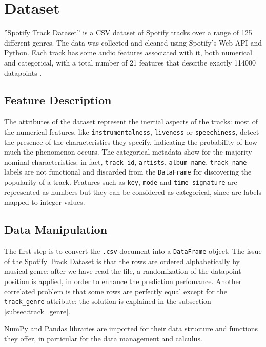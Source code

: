 \documentclass{article}
\begin{document}
\section{Dataset}
''Spotify Track Dataset'' is a CSV dataset of Spotify tracks over a range of 125 different genres. The data was collected and cleaned using Spotify's Web API and Python. Each track has some audio features associated with it, both numerical and categorical, with a total number of 21 features that describe exactly 114000 datapoints \cite{datasetKaggle}. 

\subsection{Feature Description}
\label{subsec:feature_descr}
The attributes of the dataset represent the inertial aspects of the tracks: most of the numerical features, like \texttt{instrumentalness}, \texttt{liveness} or \texttt{speechiness}, detect the presence of the characteristics they specify, indicating the probability of how much the phenomenon occurs. 
The categorical metadata show for the majority nominal characteristics: in fact, \texttt{track\_id}, \texttt{artists}, \texttt{album\_name}, \texttt{track\_name} labels are not functional and discarded from the \texttt{DataFrame} for discovering the popularity of a track. Features such as \texttt{key}, \texttt{mode} and \texttt{time\_signature} are represented as numbers but they can be considered as categorical, since are labels mapped to integer values.  

\subsection{Data Manipulation}
\label{subsec:dataman}    
The first step is to convert the \texttt{.csv} document into a \texttt{DataFrame} object. 
The issue of the Spotify Track Dataset is that the rows are ordered alphabetically by musical genre: after we have read the file, a randomization of the datapoint position is applied, in order to enhance the prediction perfomance. Another correlated problem is that some rows are perfectly equal except for the \texttt{track\_genre} attribute: the solution is explained in the subsection \ref{subsec:track_genre}. 
    
NumPy and Pandas libraries are imported for  their data structure and functions they offer, in particular for the data management and calculus.
    
\end{document}
